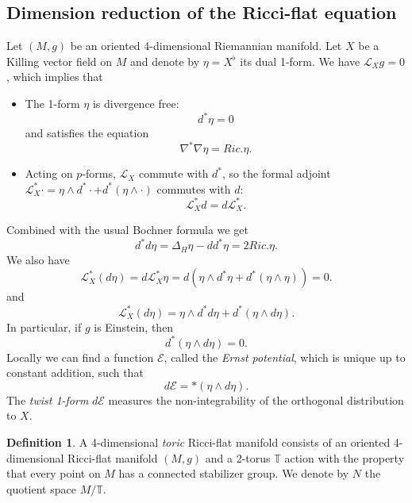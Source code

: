 \documentclass[a4paper,11pt]{amsart}
\theoremstyle{definition}
\newtheorem{definition}[theorem]{Definition}
\numberwithin{equation}{section}
\newcommand{\dT}{\mathbb{T}}
\begin{document}
\subsection{Dimension reduction of the Ricci-flat equation}
\label{subsec:reduction of Ricci-flat}
Let $(M,g)$ be an oriented  4-dimensional Riemannian manifold. Let $X$ be a Killing vector field on $M$ and denote by $\eta=X^{\flat}$ its dual 1-form. We have $\mathcal L_Xg=0$, which implies that
\begin{itemize}
    \item The 1-form $\eta$ is divergence free: \begin{equation}\label{divfree}d^*\eta=0\end{equation}
    and satisfies the equation 
     \begin{equation}\label{Bochner2} \nabla^*\nabla\eta=Ric.\eta.\end{equation}
    \item Acting on $p$-forms, $\mathcal L_X$ commute with $d^*$, so the formal adjoint $\mathcal L_X^*\cdot=\eta \wedge d^*\cdot+d^*(\eta\wedge\cdot)$  commutes with $d$: \begin{equation}\label{Liedaulcommuted}\mathcal L_X^*d=d\mathcal L_X^*.\end{equation}   
\end{itemize}
Combined with the usual Bochner formula we get 
\begin{equation}\label{Laplacian eta}d^*d\eta=\Delta_H\eta-d d^*\eta=2Ric.\eta.
\end{equation}
We also have $$\mathcal L_X^*(d\eta)=d\mathcal L_X^*\eta=d(\eta\wedge d^*\eta+d^*(\eta\wedge\eta))=0.$$
 and 
 $$\mathcal L_X^*(d\eta)=\eta\wedge d^*d\eta+d^*(\eta\wedge d\eta). $$
 In particular, if $g$ is Einstein,  then 
 $$d^*(\eta\wedge d\eta)=0. $$
Locally we can find a function  $\mathcal E$, called the \emph{Ernst potential}, which is unique up to constant addition,  such that  $$d\mathcal{E}=*(\eta\wedge d\eta).$$ 
The \emph{twist 1-form} $d\mathcal{E}$ measures the non-integrability of the orthogonal distribution to $X$.  


 \begin{definition}
 A 4-dimensional \emph{toric} Ricci-flat manifold  consists of an oriented 4-dimensional Ricci-flat manifold $(M,g)$  and a 2-torus $\mathbb T$ action with the property that every point on $M$ has a connected stabilizer group.  We denote by $N$ the quotient space $M/\dT$.
 \end{definition}
 
\end{document}
